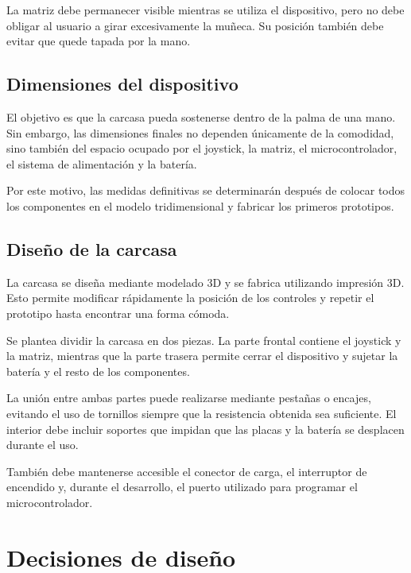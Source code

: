 La matriz debe permanecer visible mientras se utiliza el dispositivo, pero no debe obligar al usuario a girar excesivamente la muñeca. Su posición también debe evitar que quede tapada por la mano.

\subsection{Dimensiones del dispositivo}
\label{subsec:dimensiones-dispositivo}

El objetivo es que la carcasa pueda sostenerse dentro de la palma de una mano. Sin embargo, las dimensiones finales no dependen únicamente de la comodidad, sino también del espacio ocupado por el joystick, la matriz, el microcontrolador, el sistema de alimentación y la batería.

Por este motivo, las medidas definitivas se determinarán después de colocar todos los componentes en el modelo tridimensional y fabricar los primeros prototipos.


\subsection{Diseño de la carcasa}
\label{subsec:diseno-carcasa}

La carcasa se diseña mediante modelado 3D y se fabrica utilizando impresión 3D. Esto permite modificar rápidamente la posición de los controles y repetir el prototipo hasta encontrar una forma cómoda.

Se plantea dividir la carcasa en dos piezas. La parte frontal contiene el joystick y la matriz, mientras que la parte trasera permite cerrar el dispositivo y sujetar la batería y el resto de los componentes.

La unión entre ambas partes puede realizarse mediante pestañas o encajes, evitando el uso de tornillos siempre que la resistencia obtenida sea suficiente. El interior debe incluir soportes que impidan que las placas y la batería se desplacen durante el uso.

También debe mantenerse accesible el conector de carga, el interruptor de encendido y, durante el desarrollo, el puerto utilizado para programar el microcontrolador.

\section{Decisiones de diseño}
\label{sec:decisiones-diseno}

